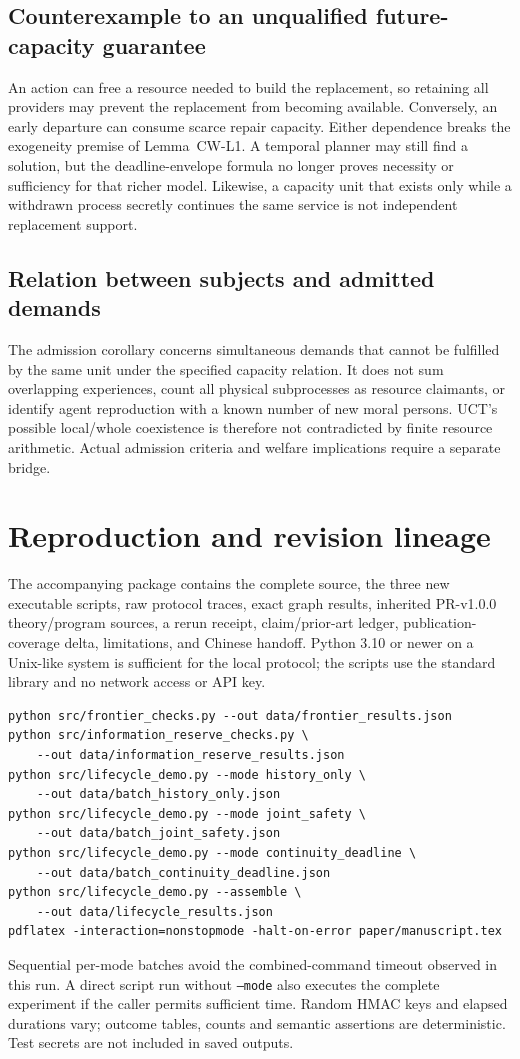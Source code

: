 \subsection{Counterexample to an unqualified future-capacity guarantee}
An action can free a resource needed to build the replacement, so retaining all providers may prevent the replacement from becoming available. Conversely, an early departure can consume scarce repair capacity. Either dependence breaks the exogeneity premise of Lemma~CW-L1. A temporal planner may still find a solution, but the deadline-envelope formula no longer proves necessity or sufficiency for that richer model. Likewise, a capacity unit that exists only while a withdrawn process secretly continues the same service is not independent replacement support.

\subsection{Relation between subjects and admitted demands}
The admission corollary concerns simultaneous demands that cannot be fulfilled by the same unit under the specified capacity relation. It does not sum overlapping experiences, count all physical subprocesses as resource claimants, or identify agent reproduction with a known number of new moral persons. UCT's possible local/whole coexistence is therefore not contradicted by finite resource arithmetic. Actual admission criteria and welfare implications require a separate bridge.

\section{Reproduction and revision lineage}
The accompanying package contains the complete source, the three new executable scripts, raw protocol traces, exact graph results, inherited PR-v1.0.0 theory/program sources, a rerun receipt, claim/prior-art ledger, publication-coverage delta, limitations, and Chinese handoff. Python 3.10 or newer on a Unix-like system is sufficient for the local protocol; the scripts use the standard library and no network access or API key.

\begin{lstlisting}
python src/frontier_checks.py --out data/frontier_results.json
python src/information_reserve_checks.py \
    --out data/information_reserve_results.json
python src/lifecycle_demo.py --mode history_only \
    --out data/batch_history_only.json
python src/lifecycle_demo.py --mode joint_safety \
    --out data/batch_joint_safety.json
python src/lifecycle_demo.py --mode continuity_deadline \
    --out data/batch_continuity_deadline.json
python src/lifecycle_demo.py --assemble \
    --out data/lifecycle_results.json
pdflatex -interaction=nonstopmode -halt-on-error paper/manuscript.tex
\end{lstlisting}
Sequential per-mode batches avoid the combined-command timeout observed in this run. A direct script run without \texttt{--mode} also executes the complete experiment if the caller permits sufficient time. Random HMAC keys and elapsed durations vary; outcome tables, counts and semantic assertions are deterministic. Test secrets are not included in saved outputs.


